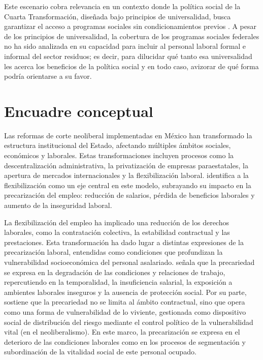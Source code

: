 \documentclass[
  spanish,
  11pt,
  a4paper,
]{scrbook}
\begin{document}
Este escenario cobra relevancia en un contexto donde la política social
de la Cuarta Transformación, diseñada bajo principios de universalidad,
busca garantizar el acceso a programas sociales sin condicionamientos
previos \autocite{GobiernoDeMexico2019}. A pesar de los principios de
universalidad, la cobertura de los programas sociales federales no ha
sido analizada en su capacidad para incluir al personal laboral formal e
informal del sector residuos; es decir, para dilucidar qué tanto esa
universalidad les acerca los beneficios de la política social y en todo
caso, avizorar de qué forma podría orientarse a su favor.

\section*{Encuadre conceptual}\label{encuadre-conceptual}


Las reformas de corte neoliberal implementadas en México han
transformado la estructura institucional del Estado, afectando múltiples
ámbitos sociales, económicos y laborales. Estas transformaciones
incluyen procesos como la descentralización administrativa, la
privatización de empresas paraestatales, la apertura de mercados
internacionales y la flexibilización laboral. \textcite{Harvey2007}
identifica a la flexibilización como un eje central en este modelo,
subrayando su impacto en la precarización del empleo: reducción de
salarios, pérdida de beneficios laborales y aumento de la inseguridad
laboral.

La flexibilización del empleo ha implicado una reducción de los derechos
laborales, como la contratación colectiva, la estabilidad contractual y
las prestaciones. Esta transformación ha dado lugar a distintas
expresiones de la precarización laboral, entendidas como condiciones que
profundizan la vulnerabilidad socioeconómica del personal asalariado.
\textcite{Rubio2017} señala que la precariedad se expresa en la
degradación de las condiciones y relaciones de trabajo, repercutiendo en
la temporalidad, la insuficiencia salarial, la exposición a ambientes
laborales inseguros y la ausencia de protección social. Por su parte,
\textcite{Lorey2016} sostiene que la precariedad no se limita al ámbito
contractual, sino que opera como una forma de vulnerabilidad de lo
viviente, gestionada como dispositivo social de distribución del riesgo
mediante el control político de la vulnerabilidad vital (en el
neoliberalismo). En este marco, la precarización se expresa en el
deterioro de las condiciones laborales como en los procesos de
segmentación y subordinación de la vitalidad social de este personal
ocupado.
\end{document}
